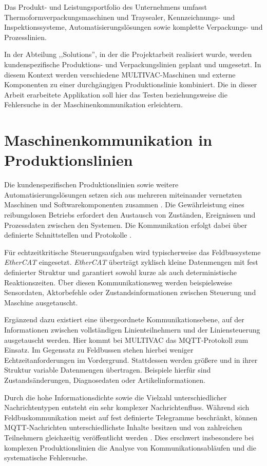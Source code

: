 Das Produkt- und Leistungsportfolio des Unternehmens umfasst Thermoformverpackungsmaschinen und Traysealer, Kennzeichnungs- und Inspektionssysteme, Automatisierungslösungen sowie komplette Verpackungs- und Prozesslinien. \autocite{Portfolio}

In der Abteilung ,,Solutions'', in der die Projektarbeit realisiert wurde, werden kundenspezifische Produktions- und Verpackungslinien geplant und umgesetzt. In diesem Kontext werden verschiedene MULTIVAC-Maschinen und externe Komponenten zu einer durchgängigen Produktionslinie kombiniert. Die in dieser Arbeit erarbeitete Applikation soll hier das Testen beziehungsweise die Fehlersuche in der Maschinenkommunikation erleichtern.

\section{Maschinenkommunikation in Produktionslinien}
Die kundenspezifischen Produktionslinien sowie weitere Automatisierungslösungen setzen sich aus mehreren miteinander vernetzten Maschinen und Softwarekomponenten zusammen \autocite{Automatisierungsloesungen}. Die Gewährleistung eines reibungslosen Betriebs erfordert den Austausch von Zuständen, Ereignissen und Prozessdaten zwischen den Systemen. Die Kommunikation erfolgt dabei über definierte Schnittstellen und Protokolle \autocite[19--20]{EtherCAT}. 

Für echtzeitkritische Steuerungsaufgaben wird typischerweise das Feldbussysteme \textit{EtherCAT} eingesetzt. \textit{EtherCAT} überträgt zyklisch kleine Datenmengen mit fest definierter Struktur und garantiert sowohl kurze als auch deterministische Reaktionszeiten. Über diesen Kommunikationsweg werden beispielsweise Sensordaten, Aktorbefehle oder Zustandsinformationen zwischen Steuerung und Maschine ausgetauscht. \autocite[287--290]{EtherCAT}

Ergänzend dazu existiert eine übergeordnete Kommunikationsebene, auf der Informationen zwischen vollständigen Linienteilnehmern und der Liniensteuerung ausgetauscht werden. Hier kommt bei MULTIVAC das MQTT-Protokoll zum Einsatz. Im Gegensatz zu Feldbussen stehen hierbei weniger Echtzeitanforderungen im Vordergrund. Stattdessen werden größere und in ihrer Struktur variable Datenmengen übertragen. Beispiele hierfür sind Zustandsänderungen, Diagnosedaten oder Artikelinformationen. \autocite{MQTTMessageQueue} 

Durch die hohe Informationsdichte sowie die Vielzahl unterschiedlicher Nachrichtentypen entsteht ein sehr komplexer Nachrichtenfluss. Während sich Feldbuskommunikation meist auf fest definierte Telegramme beschränkt, können MQTT-Nachrichten unterschiedlichste Inhalte besitzen \autocite[69]{IoTMQTT} und von zahlreichen Teilnehmern gleichzeitig veröffentlicht werden \autocite[11]{hivemqMQTTMQTT5}. Dies erschwert insbesondere bei komplexen Produktionslinien die Analyse von Kommunikationsabläufen und die systematische Fehlersuche.

